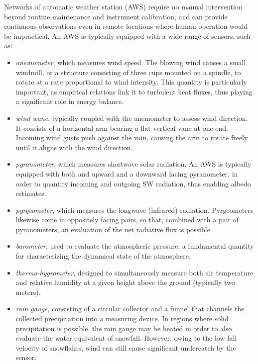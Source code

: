 Networks of automatic weather station (AWS) require no manual intervention beyond routine maintenance and instrument calibration, and can provide 
continuous observations even in remote locations where human operation would be impractical. An AWS is typically equipped with a wide range 
of sensors, such as:
\begin{itemize}[label=$\blacktriangleright$]
    \item \textit{anemometer}, which measures wind speed. The blowing wind causes a small windmill, or a structure consisting of three cups mounted 
    on a spindle, to rotate at a rate proportional to wind intensity. This quantity is particularly important, as empirical relations link it to 
    turbulent heat fluxes, thus playing a significant role in energy balance.
    \item \textit{wind wane}, typically coupled with the anemometer to assess wind direction. It consists of a horizontal arm bearing a flat vertical 
    vane at one end. Incoming wind gusts push against the vain, causing the arm to rotate freely until it aligns with the wind direction.
    \item \textit{pyranometer}, which measures shortwave solar radiation. An AWS is typically equipped with both and upward and a downward facing 
    pyranometer, in order to quantity incoming and outgoing SW radiation, thus enabling albedo estimates.
    \item \textit{pyrgeometer}, which measures the longwave (infrared) radiation. Pyrgeometers likewise come in oppositely facing pairs, so that, 
    combined with a pair of pyranometers, an evaluation of the net radiative flux is possible.
    \item \textit{barometer}, used to evaluate the atmospheric pressure, a fundamental quantity for characterizing the dynamical state of the atmosphere.
    \item \textit{thermo-hygrometer}, designed to simultaneously measure both air temperature and relative humidity at a given height above 
    the ground (typically two meters).
    \item \textit{rain gauge}, consisting of a circular collector and a funnel that channels the collected precipitation into a measuring device. In 
    regions where solid precipitation is possible, the rain gauge may be heated in order to also evaluate the water equivalent of snowfall. However, owing 
    to the low fall velocity of snowflakes, wind can still cause significant undercatch by the sensor.
\end{itemize}

